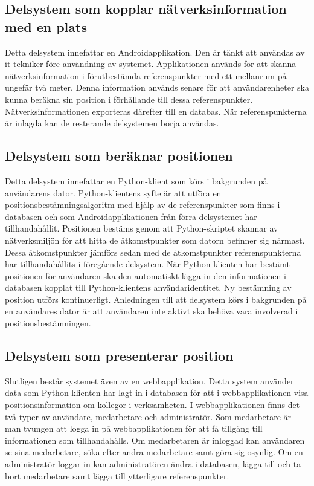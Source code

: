 \documentclass[a4paper,12pt]{article}
\begin{document}
 \subsection{Delsystem som kopplar nätverksinformation med en plats}
 Detta delsystem innefattar en Androidapplikation. Den är tänkt att användas av it-tekniker före användning av systemet. Applikationen används för att skanna nätverksinformation i förutbestämda referenspunkter med ett mellanrum på ungefär två meter. Denna information används senare för att användarenheter ska kunna beräkna sin position i förhållande till dessa referenspunkter. Nätverksinformationen exporteras därefter till en databas. När referenspunkterna är inlagda kan de resterande delsystemen börja användas.

 \subsection{Delsystem som beräknar positionen}
 Detta delsystem innefattar en Python-klient som körs i bakgrunden på användarens dator. Python-klientens syfte är att utföra en positionsbestämningsalgoritm med hjälp av de referenspunkter som finns i databasen och som Androidapplikationen från förra delsystemet har tillhandahållit. Positionen bestäms genom att Python-skriptet skannar av nätverksmiljön  för att hitta de åtkomstpunkter som datorn befinner sig närmast. Dessa åtkomstpunkter jämförs sedan med de åtkomstpunkter referenspunkterna har tillhandahållits i föregående delsystem. När Python-klienten har bestämt positionen för användaren ska den automatiskt lägga in den informationen i databasen kopplat till Python-klientens användaridentitet. Ny bestämning av position utförs kontinuerligt. Anledningen till att delsystem körs i bakgrunden på en användares dator är att användaren inte aktivt ska behöva vara involverad i positionsbestämningen.

 \subsection{Delsystem som presenterar position}
 Slutligen består systemet även av en webbapplikation. Detta system använder data som Python-klienten har lagt in i databasen för att i webbapplikationen visa positionsinformation om kollegor i verksamheten. I webbapplikationen finns det två typer av användare, medarbetare och administratör. Som medarbetare är man tvungen att logga in  på webbapplikationen för att få tillgång till informationen som tillhandahålls. Om medarbetaren är inloggad kan användaren se sina medarbetare, söka efter andra medarbetare samt göra sig osynlig. Om en administratör loggar in kan administratören ändra i databasen, lägga till och ta bort medarbetare samt lägga till ytterligare referenspunkter.
\end{document}
